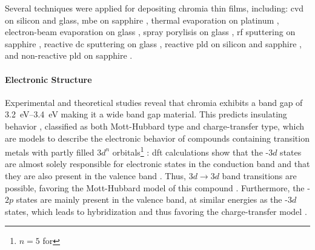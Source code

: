 Several techniques were applied for depositing chromia thin films, including:
\gls{cvd}
    \cite{cheng2000,cheng2001a,cheng2001}
    on silicon and glass,
\gls{mbe} on sapphire
    \cite{farrell2015,kehoe2016},
thermal evaporation on platinum
    \cite{robbert1998},
electron-beam evaporation on glass
    \cite{al-kuhaili2007},
spray porylisis on glass
    \cite{arca2011},
\gls{rf} sputtering on sapphire
    \cite{stepanov2021,polyakov2022a,polyakov2022},
reactive \gls{dc} sputtering on glass
    \cite{guillen2021},
reactive \gls{pld} on silicon
    \cite{caricato2010}
and sapphire
    \cite{punugupati2015},
and non-reactive \gls{pld} on sapphire
    \cite{singh2019,arca2017,kehoe2016}.

\paragraph{Electronic Structure}
Experimental and theoretical studies reveal that chromia exhibits a band gap of \qtyrange{3.2}{3.4}{\eV}
    \cite{mi2018,robbert1998,lebreau2014,arca2013}
making it a wide band gap material.
This predicts insulating behavior \cite{arca2013}, classified as both Mott-Hubbard type and charge-transfer type, which are models to describe the electronic behavior of compounds containing transition metals with partly filled $3d^n$ orbitals\footnote{$n=5$ for }
    \cite{catti1996,mi2018,lebreau2014}:
\gls{dft} calculations show that the -$3d$ states are almost solely responsible for electronic states in the conduction band and that they are also present in the valence band
    \cite{mi2018,lebreau2014}.
Thus, $3d\longrightarrow 3d$ band transitions are possible, favoring the Mott-Hubbard model of this compound
    \cite{lebreau2014}.
Furthermore, the -$2p$ states are mainly present in the valence band, at similar energies as the -$3d$ states, which leads to hybridization and thus favoring the charge-transfer model
    \cite{lebreau2014}.

